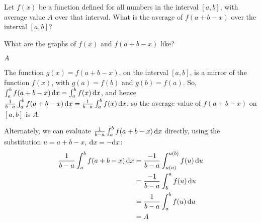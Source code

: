 \begin{question}
Let $f(x)$ be a function defined for all numbers in the interval $[a,b]$, with average value $A$ over that interval. What is the average of $f(a+b-x)$ over the interval $[a,b]$?
\end{question}
\begin{hint}
What are the graphs of $f(x)$ and $f(a+b-x)$ like?
\end{hint}
\begin{answer}
$A$
\end{answer}
\begin{solution}
The function $g(x)=f(a+b-x)$, on the interval $[a,b]$, is a mirror of the function $f(x)$, with $g(a)=f(b)$ and $g(b)=f(a)$. So, $\int_a^b f(a+b-x)\,\mathrm{d}x = \int_a^bf(x)\,\mathrm{d}x$, and hence $\frac{1}{b-a}\int_a^b f(a+b-x)\,\mathrm{d}x = \frac{1}{b-a}\int_a^bf(x)\,\mathrm{d}x$, so the average value of $f(a+b-x)$ on $[a,b]$ is $A$.

Alternately, we can evaluate $\frac{1}{b-a}\int_a^b f(a+b-x)\,\mathrm{d}x$ directly, using the substitution $u=a+b-x$, $\mathrm{d}x=-\mathrm{d}x$:
\begin{align*}
\frac{1}{b-a}\int_a^b f(a+b-x)\,\mathrm{d}x&=\frac{-1}{b-a}\int_{u(a)}^{u(b)} f(u)\,\mathrm{d}u\\
&=\frac{-1}{b-a}\int_{b}^{a} f(u)\,\mathrm{d}u
\\&=\frac{1}{b-a}\int_{a}^{b} f(u)\,\mathrm{d}u
\\&=A
\end{align*}
\end{solution}




